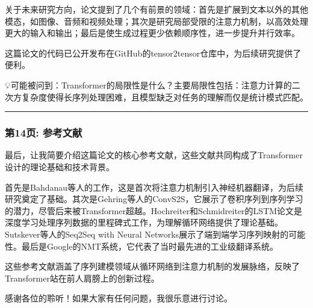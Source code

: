 \documentclass[11pt,a4paper]{article}
\begin{document}
关于未来研究方向，论文提到了几个有前景的领域：首先是扩展到文本以外的其他模态，如图像、音频和视频处理；其次是研究局部受限的注意力机制，以高效处理更大的输入和输出；最后是使生成过程更少依赖顺序性，进一步提升并行效率。

这篇论文的代码已公开发布在GitHub的tensor2tensor仓库中，为后续研究提供了便利。

💡可能被问到：Transformer的局限性是什么？主要局限性包括：注意力计算的二次方复杂度使得长序列处理困难，且模型缺乏对任务的理解而仅是统计模式匹配。

\vspace{0.5em}\noindent\rule{\textwidth}{0.4pt}\vspace{0.5em}

\subsubsection*{第14页: 参考文献}

最后，让我简要介绍这篇论文的核心参考文献，这些文献共同构成了Transformer设计的理论基础和技术背景。

首先是Bahdanau等人的工作，这是首次将注意力机制引入神经机器翻译，为后续研究奠定了基础。其次是Gehring等人的ConvS2S，它展示了卷积序列到序列学习的潜力，尽管后来被Transformer超越。Hochreiter和Schmidreiter的LSTM论文是深度学习处理序列数据的里程碑式工作，为理解循环网络提供了理论基础。Sutskever等人的Seq2Seq with Neural Networks展示了端到端学习序列映射的可能性。最后是Google的NMT系统，它代表了当时最先进的工业级翻译系统。

这些参考文献涵盖了序列建模领域从循环网络到注意力机制的发展脉络，反映了Transformer站在前人肩膀上的创新过程。

感谢各位的聆听！如果大家有任何问题，我很乐意进行讨论。
\end{document}
